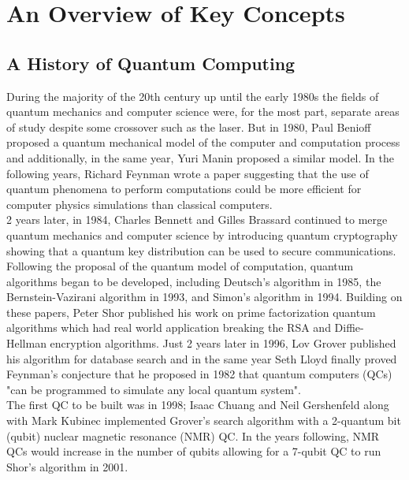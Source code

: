 \documentclass[reqno]{amsart}
\numberwithin{equation}{section}
\numberwithin{figure}{section}
\begin{document}
\section{An Overview of Key Concepts}
\subsection{A History of Quantum Computing}
\begin{justify}
During the majority of the 20th century up until the early 1980s the fields of quantum mechanics and computer science were, for the most part, separate areas of study despite some crossover such as the laser. But in 1980, Paul Benioff proposed a quantum mechanical model of the computer and computation process \cite{Benioff1980} and additionally, in the same year, Yuri Manin proposed a similar model. \cite{Manin1980} In the following years, Richard Feynman wrote a paper suggesting that the use of quantum phenomena to perform computations could be more efficient for computer physics simulations than classical computers. \cite{Feynman1982} \\
2 years later, in 1984, Charles Bennett and Gilles Brassard continued to merge quantum mechanics and computer science by introducing quantum cryptography \cite{BennettBrassard1984} showing that a quantum key distribution can be used to secure communications. \\

Following the proposal of the quantum model of computation, quantum algorithms began to be developed, including Deutsch's algorithm in 1985, \cite{Deutsch1985} the Bernstein-Vazirani algorithm in 1993, \cite{BernsteinVazirani1993} and Simon's algorithm in 1994. \cite{Simon1994} Building on these papers, Peter Shor published his work on prime factorization quantum algorithms which had real world application breaking the RSA and Diffie-Hellman encryption algorithms. \cite{Shor1994} Just 2 years later in 1996, Lov Grover published his algorithm for database search \cite{Grover1996} and in the same year Seth Lloyd finally proved Feynman's conjecture that he proposed in 1982 that quantum computers (QCs) "can be programmed to simulate any local quantum system". \cite{Lloyd1996} \\

The first QC to be built was in 1998; Isaac Chuang and Neil Gershenfeld along with Mark Kubinec implemented Grover's search algorithm with a 2-quantum bit (qubit) nuclear magnetic resonance (NMR) QC. \cite{ChuangGershefeldKubinec1998} In the years following, NMR QCs would increase in the number of qubits allowing for a 7-qubit QC to run Shor's algorithm in 2001. \cite{Vandersypen2001} \\


\end{justify}
\end{document}
